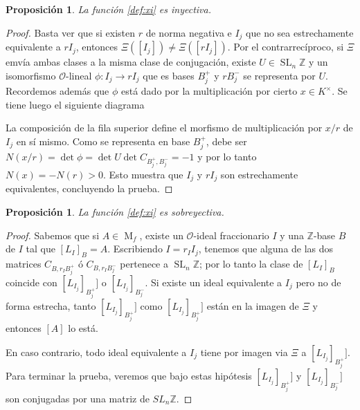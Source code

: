 \documentclass[11pt,a4paper]{amsart}
\newcommand{\Z}{\mathbb{Z}}
\DeclareMathOperator{\M}{M}
\DeclareMathOperator{\SL}{SL}
\numberwithin{equation}{section}
\theoremstyle{plain}
\newtheorem{prop}[equation]{Proposición}
\renewcommand{\O}{\mathcal{O}}
\begin{document}
\begin{prop} La función \eqref{def:xi} es inyectiva.
\end{prop}
\begin{proof}Basta ver que si existen $r$ de
norma negativa e $I_j$ que no sea estrechamente
equivalente a $r I_j$, entonces $\Xi([I_j])
\neq \Xi([rI_j])$. Por el contrarrecíproco,
si $\Xi$ emvía ambas clases a la misma clase de conjugación,
existe $U \in \SL_n \Z$ y un isomorfismo $\O$-lineal
$\phi \colon I_j \to r I_j$ que es bases $B_j^+$ y $r B_j^-$
se representa por $U$. Recordemos además que $\phi$
está dado por la multiplicación por cierto $x \in K^\times$.
Se tiene luego el siguiente diagrama
\begin{center}
\end{center}
La composición de la fila superior define el morfismo de multiplicación por
$x/r$ de $I_j$ en sí mismo. Como se representa en base $B_j^+$, debe ser
$N(x/r) = \det \phi = \det U \det C_{B_j^+, B_j^-} = -1$ y por lo
tanto $N(x) = -N(r) > 0$. Esto muestra que $I_j$ y $rI_j$ son estrechamente
equivalentes, concluyendo la prueba.
\end{proof}

\begin{prop} La función \eqref{def:xi} es sobreyectiva.
\end{prop}
\begin{proof} Sabemos que
si $A \in \M_f$, existe un $\O$-ideal fraccionario $I$ y una $\Z$-base
$B$ de $I$ tal que $[L_I]_B = A$. Escribiendo $I = r_I I_j$,
tenemos que alguna de las dos matrices $C_{B,r_I B_j^+}$ ó
$C_{B,r_I B_j^-}$ pertenece a $\SL_n \Z$; por lo tanto la clase
de $[L_I]_B$ coincide con $[L_{I_j}]_{B^+_j}]$ o
$[L_{I_j}]_{B^-_j}$. Si existe un ideal equivalente a $I_j$
pero no de forma estrecha, tanto $[L_{I_j}]_{B^+_j}]$ como
$[L_{I_j}]_{B^+_j}]$ están en la imagen de $\Xi$ y entonces $[A]$
lo está.

En caso contrario, todo ideal equivalente a $I_j$ tiene por imagen via
$\Xi$ a $[L_{I_j}]_{B^+_j}]$. Para terminar la prueba, veremos que bajo
estas hipótesis $[L_{I_j}]_{B^+_j}]$ y $[L_{I_j}]_{B^-_j}]$ son conjugadas
por una matriz de $SL_n \Z$.
\end{proof}
\end{document}
